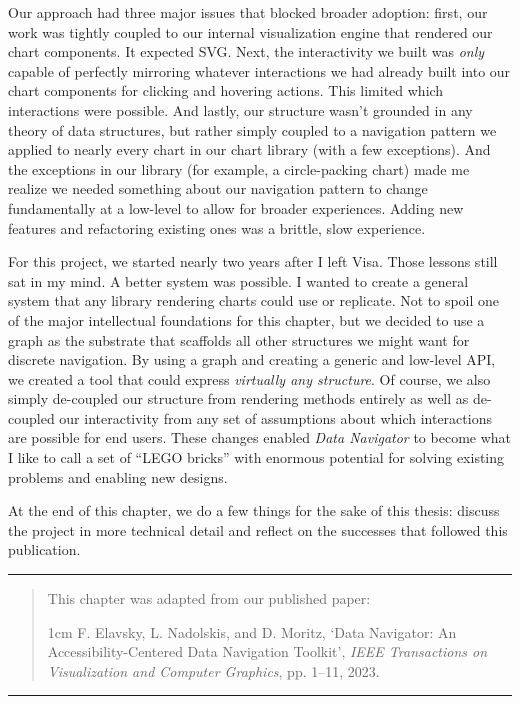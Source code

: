 \documentclass[12pt]{cmuthesis}
\begin{document}
Our approach had three major issues that blocked broader adoption: first, our work was tightly coupled to our internal visualization engine that rendered our chart components. It expected SVG. Next, the interactivity we built was \textit{only} capable of perfectly mirroring whatever interactions we had already built into our chart components for clicking and hovering actions. This limited which interactions were possible. And lastly, our structure wasn't grounded in any theory of data structures, but rather simply coupled to a navigation pattern we applied to nearly every chart in our chart library (with a few exceptions). And the exceptions in our library (for example, a circle-packing chart) made me realize we needed something about our navigation pattern to change fundamentally at a low-level to allow for broader experiences. Adding new features and refactoring existing ones was a brittle, slow experience.

For this project, we started nearly two years after I left Visa. Those lessons still sat in my mind. A better system was possible. I wanted to create a general system that any library rendering charts could use or replicate. Not to spoil one of the major intellectual foundations for this chapter, but we decided to use a graph as the substrate that scaffolds all other structures we might want for discrete navigation. By using a graph and creating a generic and low-level API, we created a tool that could express \textit{virtually any structure}. Of course, we also simply de-coupled our structure from rendering methods entirely as well as de-coupled our interactivity from any set of assumptions about which interactions are possible for end users. These changes enabled \textit{Data Navigator} to become what I like to call a set of ``LEGO bricks'' with enormous potential for solving existing problems and enabling new designs.

At the end of this chapter, we do a few things for the sake of this thesis: discuss the project in more technical detail and reflect on the successes that followed this publication.

\newpage
\noindent\rule{16cm}{0.4pt}
\begin{quote}
This chapter was adapted from our published paper:
\begin{adjustwidth}{1cm}{}
F. Elavsky, L. Nadolskis, and D. Moritz, ‘Data Navigator: An Accessibility-Centered Data Navigation Toolkit’, \textit{IEEE Transactions on Visualization and Computer Graphics}, pp. 1–11, 2023.
\end{adjustwidth}
\end{quote}
\noindent\rule{16cm}{0.4pt}
\end{document}
